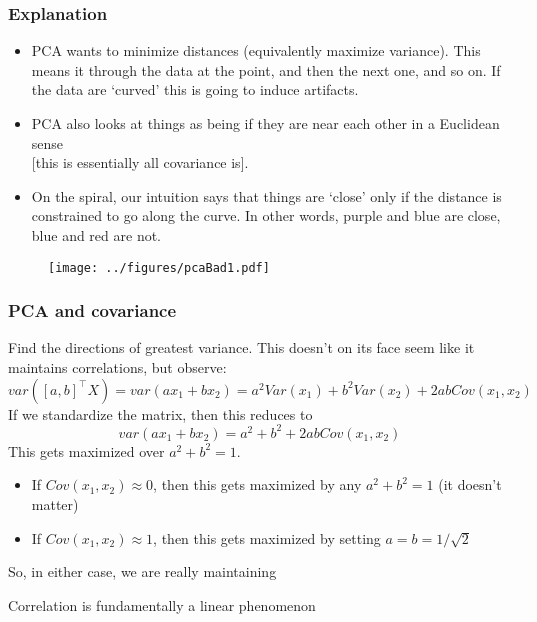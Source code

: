\documentclass{beamer}
\begin{document}
\begin{frame}[fragile]
  \frametitle{Explanation}
  \begin{itemize}
  \item PCA wants to minimize distances (equivalently maximize
    variance).  This means it  through the data at the
     point, and then the next one, and so on.  If the data are
    `curved' this is going to induce artifacts.  
  \item PCA also looks at things as being  if they are near each
    other in a Euclidean sense \\
    {\scriptsize [this is essentially  all covariance is]}.  
    
  \item On the spiral, our intuition says
    that things are `close' only if the distance is constrained to go
    along the curve.  In other words, purple and blue are close, blue and
    red are not. 
  \end{itemize}
    \begin{figure}
    \centering
      \texttt{[image: ../figures/pcaBad1.pdf]}
        \end{figure}
\end{frame}

\begin{frame}
\frametitle{PCA and covariance}

 Find the directions of greatest variance.  This doesn't on its
face seem like it maintains correlations, but observe:
\[
var([a,b]^{\top}X) = var(ax_1 +bx_2) = a^2 Var(x_1)+ b^2 Var(x_2) + 2abCov(x_1,x_2)
\]
If we standardize the matrix, then this reduces to
\[
var(ax_1 +bx_2) = a^2 + b^2 + 2abCov(x_1,x_2)
\]
This gets maximized over $a^2 + b^2 = 1$.  
\begin{itemize}
\item If $Cov(x_1,x_2) \approx 0$, then this gets maximized
by any $a^2+b^2 = 1$ (it doesn't matter)
\item If $Cov(x_1,x_2) \approx 1$, then this gets maximized 
by setting $a=b = 1/\sqrt{2}$
\end{itemize}
So, in either case, we are really maintaining 

\vsp
Correlation is fundamentally a linear phenomenon
\end{frame}
\end{document}
